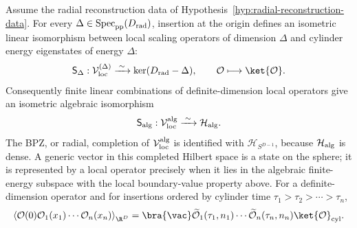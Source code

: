 \begin{theorem}
\label{thm:state-operator-correspondence}
Assume the radial reconstruction data of
Hypothesis~\ref{hyp:radial-reconstruction-data}.  For every
\(\Delta\in\operatorname{Spec}_{\rm pp}(D_{\rm rad})\), insertion at the
origin defines an isometric linear isomorphism between local scaling operators
of dimension \(\Delta\) and cylinder energy eigenstates of energy \(\Delta\):
\begin{equation}
  \mathsf S_\Delta:
  \mathcal V_{\rm loc}^{(\Delta)}
  \xrightarrow{\;\sim\;}
  \ker(D_{\rm rad}-\Delta),
  \qquad
  \mathcal O\longmapsto\ket{\mathcal O}.
  \label{eq:state-operator-map-degree-delta}
\end{equation}
Consequently finite linear combinations of definite-dimension local operators
give an isometric algebraic isomorphism
\[
  \mathsf S_{\rm alg}:
  \mathcal V_{\rm loc}^{\rm alg}
  \xrightarrow{\;\sim\;}
  \mathcal H_{\rm alg}.
\]
The BPZ, or radial, completion of
\(\mathcal V_{\rm loc}^{\rm alg}\) is identified with
\(\mathcal H_{S^{D-1}}\), because \(\mathcal H_{\rm alg}\) is dense.  A
generic vector in this completed Hilbert space is a state on the sphere; it is
represented by a local operator precisely when it lies in the algebraic
finite-energy subspace with the local boundary-value property above.  For a
definite-dimension operator and for insertions ordered by cylinder time
\(\tau_1>\tau_2>\cdots>\tau_n\),
\begin{equation}
  \left\langle
  \mathcal O(0)\mathcal O_1(x_1)\cdots\mathcal O_n(x_n)
  \right\rangle_{\R^D}
  =
  \bra{\vac}
  \widetilde{\mathcal O}_1(\tau_1,n_1)\cdots
  \widetilde{\mathcal O}_n(\tau_n,n_n)
  \ket{\mathcal O}_{\rm cyl}.
  \label{eq:state-operator-correlation-formula}
\end{equation}
\end{theorem}

